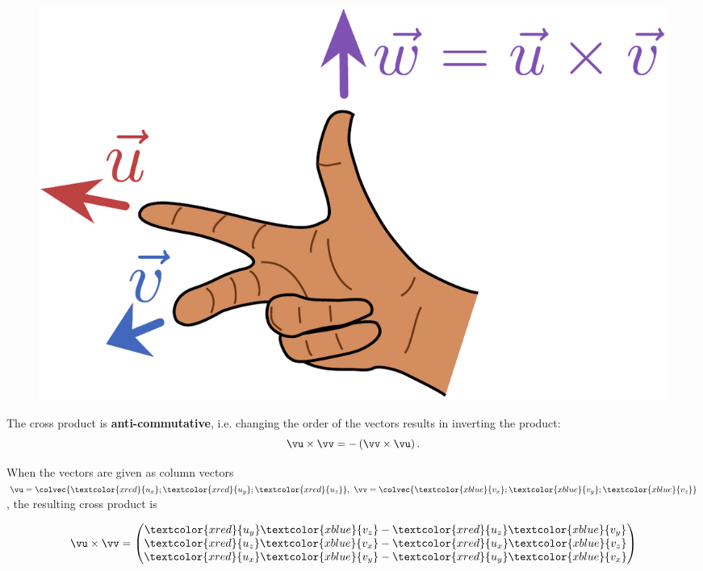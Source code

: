 \begin{figure}[H]
\centering
\includegraphics[scale=0.35]{figures/linear_algebra/rhr.pdf}
\end{figure}

The cross product is \textbf{anti-commutative}, i.e. changing the order of the vectors results in inverting the product:
  \begin{equation*}
  \vu\times\vv = -\left( \vv\times\vu \right).
  \end{equation*}

When the vectors are given as column vectors $\vu=\colvec{\textcolor{xred}{u_{x}};\textcolor{xred}{u_{y}};\textcolor{xred}{u_{z}}},\ \vv=\colvec{\textcolor{xblue}{v_{x}};\textcolor{xblue}{v_{y}};\textcolor{xblue}{v_{z}}}$, the resulting cross product is

\begin{equation}
	\vu\times\vv = \begin{pmatrix}\textcolor{xred}{u_{y}}\textcolor{xblue}{v_{z}}-\textcolor{xred}{u_{z}}\textcolor{xblue}{v_{y}}\\\textcolor{xred}{u_{z}}\textcolor{xblue}{v_{x}}-\textcolor{xred}{u_{x}}\textcolor{xblue}{v_{z}}\\\textcolor{xred}{u_{x}}\textcolor{xblue}{v_{y}}-\textcolor{xred}{u_{y}}\textcolor{xblue}{v_{x}}\end{pmatrix}
	\label{eq:cross product calculation}
\end{equation}

